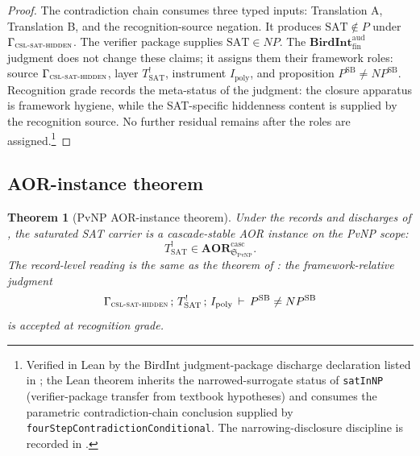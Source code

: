 \documentclass[11pt]{article}
\newcommand{\Tsat}{T^{!}_{\mathrm{SAT}}}
\newcommand{\Ipoly}{I_{\mathrm{poly}}}
\newcommand{\CSLSATHidden}{\Gamma_{\textsc{csl-sat-hidden}}}
\newcommand{\BIJudgment}[4]{#1\,;\,#2\,;\,#3\,\vdash\,#4}
\newcommand{\PSB}{P^{\mathrm{SB}}}
\newcommand{\NPSB}{NP^{\mathrm{SB}}}
\newcommand{\BirdInt}{\mathbf{BirdInt}^{\mathrm{aud}}_{\mathrm{fin}}}
\newcommand{\RecognitionGrade}{\emph{recognition grade}}
\newtheorem{theorem}{Theorem}[section]
\theoremstyle{definition}
\begin{document}
\begin{proof}
The contradiction chain consumes three typed inputs: Translation A,
Translation B, and the recognition-source negation.  It produces
\(\mathrm{SAT}\notin P\) under \(\CSLSATHidden\).  The verifier
package supplies \(\mathrm{SAT}\in NP\).  The \(\BirdInt\) judgment
does not change these claims; it assigns them their framework roles:
source \(\CSLSATHidden\), layer \(\Tsat\), instrument \(\Ipoly\), and
proposition \(\PSB\neq\NPSB\).  Recognition grade records the
meta-status of the judgment: the closure apparatus is framework
hygiene, while the SAT-specific hiddenness content is supplied by the
recognition source.  No further residual remains after the roles are
assigned.\footnote{Verified in Lean by the BirdInt judgment-package
discharge declaration listed in ; the Lean
theorem inherits the narrowed-surrogate status of \texttt{satInNP}
(verifier-package transfer from textbook hypotheses) and consumes the
parametric contradiction-chain conclusion supplied by
\texttt{fourStepContradictionConditional}.  The narrowing-disclosure
discipline is recorded in .}
\end{proof}

\subsection{AOR-instance theorem}

\begin{theorem}[PvNP AOR-instance theorem]
\label{thm:pvnp:aor:in-aor-casc}
Under the records and discharges of
, the saturated SAT carrier is a
cascade-stable AOR instance on the PvNP scope:
\[
  \Tsat \in
  \mathbf{AOR}^{\mathrm{casc}}_{\mathfrak S_{\mathrm{PvNP}}}.
\]
The record-level reading is the same as the theorem of
: the framework-relative judgment
\[
  \BIJudgment{\CSLSATHidden}{\Tsat}{\Ipoly}{\PSB\neq\NPSB}
\]
is accepted at \RecognitionGrade{}.
\end{theorem}
\end{document}
